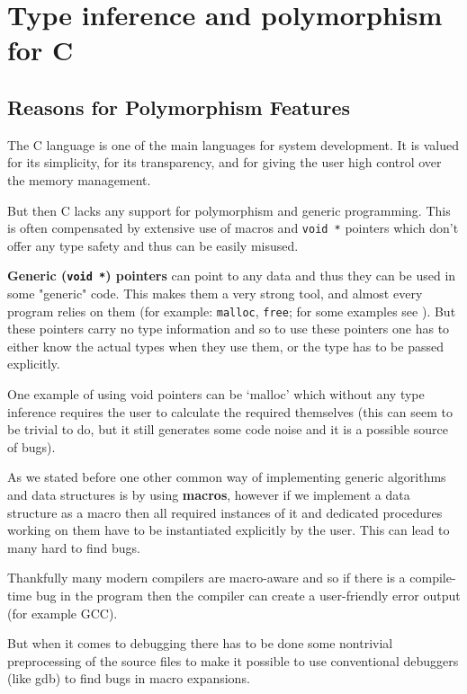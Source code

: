 \chapter{Type inference and polymorphism for C}

\section{Reasons for Polymorphism Features}

The C language is one of the main languages for system development. It is valued for its simplicity, for its transparency, and for giving the user high control over the memory management.

But then C lacks any support for polymorphism and generic programming. This is often compensated by extensive use of macros and \lstinline{void *} pointers which don't offer any type safety and thus can be easily misused.

\textbf{Generic (\lstinline{void *}) pointers} can point to any data and thus they can be used in some "generic" code. This makes them a very strong tool, and almost every program relies on them (for example: \lstinline{malloc}, \lstinline{free}; for some examples see \cite{organisation1999iso}). But these pointers carry no type information and so to use these pointers one has to either know the actual types when they use them, or the type has to be passed explicitly.

One example of using void pointers can be `malloc' which without any type inference requires the user to calculate the required themselves (this can seem to be trivial to do, but it still generates some code noise and it is a possible source of bugs).

As we stated before one other common way of implementing generic algorithms and data structures is by using \textbf{macros}, however if we implement a data structure as a macro then all required instances of it and dedicated procedures working on them have to be instantiated explicitly by the user. This can lead to many hard to find bugs.

Thankfully many modern compilers are macro-aware and so if there is a compile-time bug in the program then the compiler can create a user-friendly error output (for example GCC). %

But when it comes to debugging there has to be done some nontrivial preprocessing of the source files to make it possible to use conventional debuggers (like gdb) to find bugs in macro expansions. %

